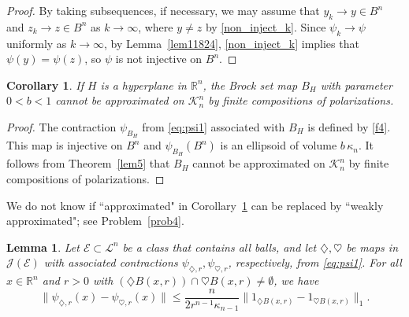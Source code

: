 \documentclass[12pt,reqno]{amsart}
\newcommand{\R}{{\mathbb R}}
\newcommand{\cK}{\mathcal K}
\newcommand{\cL}{\mathcal L}
\newcommand{\cJ}{\mathcal J}
\newcommand{\cE}{{\mathcal E}}
\newtheorem{lem}[thm]{Lemma}
\newtheorem{cor}[thm]{Corollary}
\newcommand{\di}{\diamondsuit}
\numberwithin{equation}{section}
\begin{document}
\begin{proof}
By taking subsequences, if necessary, we may assume that $y_k\to y\in B^n$ and $z_k\to z\in B^n$ as $k\to\infty$, where $y\neq z$ by \eqref{non_inject_k}. Since $\psi_k\to \psi$ uniformly as $k\to\infty$, by Lemma~\ref{lem11824}, \eqref{non_inject_k} implies that $\psi(y)=\psi(z)$, so $\psi$ is not injective on $B^n$.
\end{proof}

\begin{cor}\label{cor42}
If $H$ is a hyperplane in $\R^n$, the Brock set map $B_H$ with parameter $0<b<1$ cannot be approximated on ${\cK}^n_n$ by finite compositions of polarizations.
\end{cor}

\begin{proof}
The contraction $\psi_{B_H}$ from \eqref{eq:psi1} associated with $B_H$ is defined by \eqref{f4}.  This map is injective on $B^n$ and $\psi_{B_H}(B^n)$ is an ellipsoid of volume $b\,\kappa_n$.  It follows from Theorem~\ref{lem5} that $B_H$ cannot be approximated on ${\cK}^n_n$ by finite compositions of polarizations.
\end{proof}

We do not know if ``approximated" in Corollary~\ref{cor42} can be replaced by ``weakly approximated"; see Problem~\ref{prob4}.

\begin{lem}\label{lem_balls_close}
Let $\cE\subset \cL^n$ be a class that contains all balls, and let  $\di,\heartsuit$ be maps in $\cJ(\cE)$ with associated contractions $\psi_{\di,r},\psi_{\heartsuit,r}$, respectively, from \eqref{eq:psi1}.
For all $x\in \R^n$ and $r>0$ with $(\di B(x,r))\cap \heartsuit B(x,r)\ne\emptyset$, we have
\[
\|\psi_{\di,r}(x)-\psi_{\heartsuit,r}(x)\|\le \frac{n}{2r^{n-1}\kappa_{n-1}}\|1_{\di B(x,r)}-1_{\heartsuit B(x,r)}\|_1.
\]
\end{lem}
\end{document}

